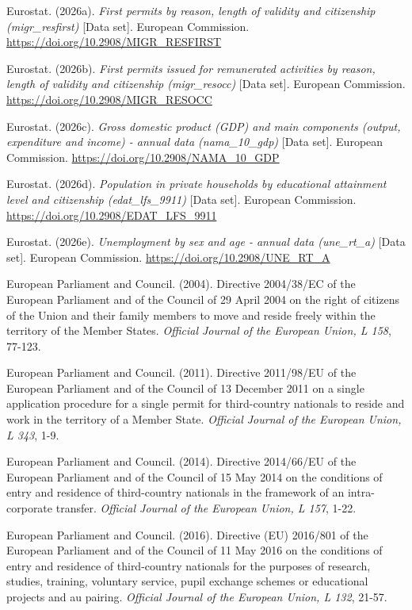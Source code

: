 \documentclass[11pt,a4paper]{article}
\newenvironment{hangrefs}{%
  \par\begingroup\setlength{\leftskip}{1.5em}\setlength{\parindent}{-1.5em}%
}{\par\endgroup}
\begin{document}
\begin{hangrefs}
Eurostat. (2026a). \emph{First permits by reason, length of validity and
citizenship (migr\_resfirst)} {[}Data set{]}. European Commission.
\url{https://doi.org/10.2908/MIGR_RESFIRST}

Eurostat. (2026b). \emph{First permits issued for remunerated activities
by reason, length of validity and citizenship (migr\_resocc)} {[}Data
set{]}. European Commission. \url{https://doi.org/10.2908/MIGR_RESOCC}

Eurostat. (2026c). \emph{Gross domestic product (GDP) and main
components (output, expenditure and income) - annual data
(nama\_10\_gdp)} {[}Data set{]}. European Commission.
\url{https://doi.org/10.2908/NAMA_10_GDP}

Eurostat. (2026d). \emph{Population in private households by educational
attainment level and citizenship (edat\_lfs\_9911)} {[}Data set{]}.
European Commission. \url{https://doi.org/10.2908/EDAT_LFS_9911}

Eurostat. (2026e). \emph{Unemployment by sex and age - annual data
(une\_rt\_a)} {[}Data set{]}. European Commission.
\url{https://doi.org/10.2908/UNE_RT_A}

European Parliament and Council. (2004). Directive 2004/38/EC of the
European Parliament and of the Council of 29 April 2004 on the right of
citizens of the Union and their family members to move and reside freely
within the territory of the Member States. \emph{Official Journal of the
European Union, L 158}, 77-123.

European Parliament and Council. (2011). Directive 2011/98/EU of the
European Parliament and of the Council of 13 December 2011 on a single
application procedure for a single permit for third-country nationals to
reside and work in the territory of a Member State. \emph{Official
Journal of the European Union, L 343}, 1-9.

European Parliament and Council. (2014). Directive 2014/66/EU of the
European Parliament and of the Council of 15 May 2014 on the conditions
of entry and residence of third-country nationals in the framework of an
intra-corporate transfer. \emph{Official Journal of the European Union,
L 157}, 1-22.

European Parliament and Council. (2016). Directive (EU) 2016/801 of the
European Parliament and of the Council of 11 May 2016 on the conditions
of entry and residence of third-country nationals for the purposes of
research, studies, training, voluntary service, pupil exchange schemes
or educational projects and au pairing. \emph{Official Journal of the
European Union, L 132}, 21-57.


\end{hangrefs}
\end{document}
